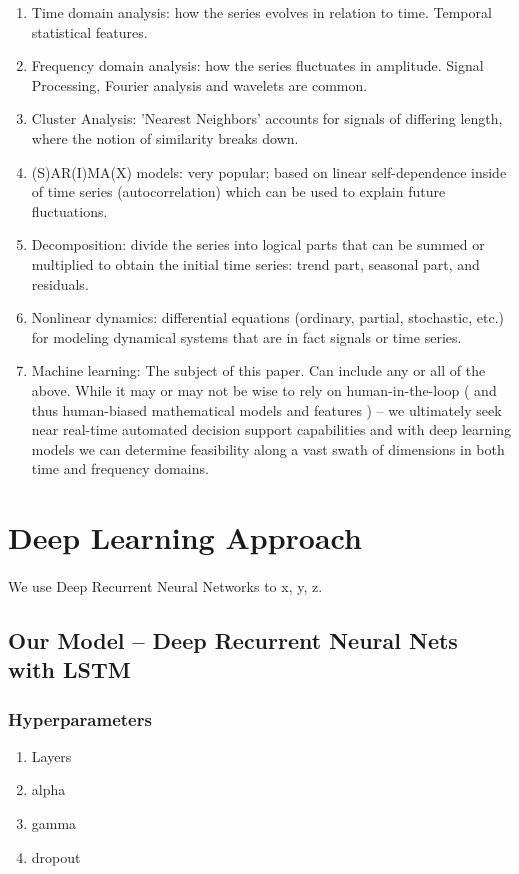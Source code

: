 \documentclass{article}
\begin{document}
\begin{enumerate}
    \item Time domain analysis: how the series evolves in relation to time. Temporal statistical features.
    \item Frequency domain analysis: how the series fluctuates in amplitude. Signal Processing, Fourier analysis and wavelets are common.
    \item Cluster Analysis: 'Nearest Neighbors' accounts for signals of differing length, where the notion of similarity breaks down.
    \item (S)AR(I)MA(X) models: very popular; based on linear self-dependence inside of time series (autocorrelation) which can be used to explain future fluctuations.
    \item Decomposition: divide the series into logical parts that can be summed or multiplied to obtain the initial time series: trend part, seasonal part, and residuals.
    \item Nonlinear dynamics: differential equations (ordinary, partial, stochastic, etc.) for modeling dynamical systems that are in fact signals or time series.
    \item Machine learning: The subject of this paper. Can include any or all of the above. While it may or may not be wise to rely on human-in-the-loop ( and thus human-biased mathematical models and features ) – we ultimately seek near real-time automated decision support capabilities and with deep learning models we can determine feasibility along a vast swath of dimensions in both time and frequency domains.
\end{enumerate}

\section{Deep Learning Approach}
\paragraph{}We use Deep Recurrent Neural Networks to x, y, z.
\subsection{Our Model – Deep Recurrent Neural Nets with LSTM}
\subsubsection{Hyperparameters}
\begin{enumerate}
    \item Layers
    \item alpha
    \item gamma
    \item dropout
\end{enumerate}
\end{document}
